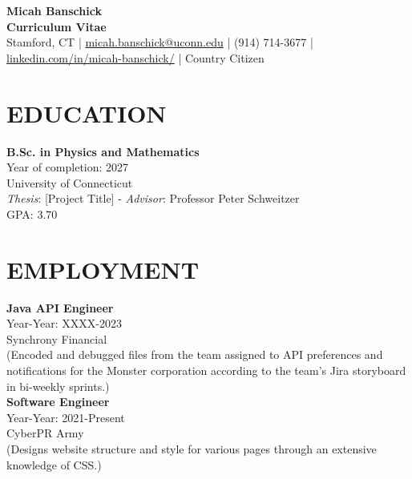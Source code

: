 \documentclass[a4paper,9pt]{extarticle}
\begin{document}
\pagestyle{empty}

\begin{center}
\textbf{\Large Micah Banschick }\\[3pt] %
\textbf{Curriculum Vitae}\\[1pt] %
Stamford, CT | \href{mailto:micah.banschick@uconn.edu}{micah.banschick@uconn.edu} | (914) 714-3677 | \href{https://www.linkedin.com/in/micah-banschick/}{linkedin.com/in/micah-banschick/} | Country Citizen %
\end{center}


\section*{EDUCATION}

\noindent
\newline
\textbf{B.Sc. in Physics and Mathematics} \\
Year of completion: 2027 \\ 
University of Connecticut \\ 
\textit{Thesis}: [Project Title] - \textit{Advisor}: Professor Peter Schweitzer \\
GPA: 3.70 \\


\section*{EMPLOYMENT}
\noindent
\newline
\textbf{Java API Engineer} \\
Year-Year: XXXX-2023 \\
Synchrony Financial \\ 
(Encoded and debugged files from the team assigned to API preferences and notifications for the Monster corporation according to the team’s Jira storyboard in bi-weekly sprints.) \\ 

\noindent
\textbf{Software Engineer} \\
Year-Year: 2021-Present \\
CyberPR Army \\ 
(Designs website structure and style for various pages through an extensive knowledge of CSS.) \\
\end{document}
